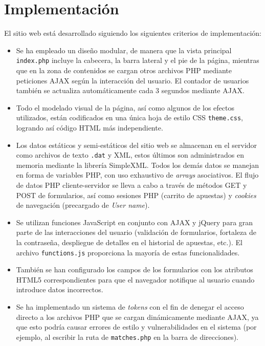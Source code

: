 \documentclass{article}
\begin{document}
\section{Implementación}
El sitio web está desarrollado siguiendo los siguientes criterios de implementación:
\begin{itemize}
    \item Se ha empleado un diseño modular, de manera que la vista principal \texttt{index.php} incluye la cabecera, la barra lateral y el pie de la página, mientras que en la zona de contenidos se cargan otros archivos PHP mediante peticiones AJAX según la interacción del usuario. El contador de usuarios también se actualiza automáticamente cada 3 segundos mediante AJAX.
    \item Todo el modelado visual de la página, así como algunos de los efectos utilizados, están codificados en una única hoja de estilo CSS \texttt{theme.css}, logrando así código HTML más independiente.
    \item Los datos estáticos y semi-estáticos del sitio web se almacenan en el servidor como archivos de texto \texttt{.dat} y XML, estos últimos son administrados en memoria mediante la librería SimpleXML. Todos los demás datos se manejan en forma de variables PHP, con uso exhaustivo de \textit{arrays} asociativos. El flujo de datos PHP cliente-servidor se lleva a cabo a través de métodos GET y POST de formularios, así como sesiones PHP (carrito de apuestas) y \textit{cookies} de navegación (precargado de \textit{User name}).
    \item Se utilizan funciones JavaScript en conjunto con AJAX y jQuery para gran parte de las interacciones del usuario (validación de formularios, fortaleza de la contraseña, despliegue de detalles en el historial de apuestas, etc.). El archivo \texttt{functions.js} proporciona la mayoría de estas funcionalidades.
    \item También se han configurado los campos de los formularios con los atributos HTML5 correspondientes para que el navegador notifique al usuario cuando introduce datos incorrectos.
    \item Se ha implementado un sistema de \textit{tokens} con el fin de denegar el acceso directo a los archivos PHP que se cargan dinámicamente mediante AJAX, ya que esto podría causar errores de estilo y vulnerabilidades en el sistema (por ejemplo, al escribir la ruta de \texttt{matches.php} en la barra de direcciones).
\end{itemize}
\end{document}
